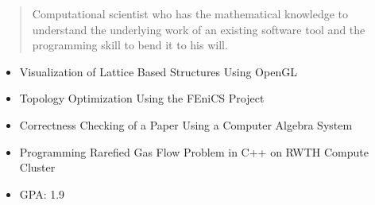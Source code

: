 \documentclass[10pt,a4paper,ragged2e,withhyper]{altacv}
\begin{document}
\begin{paracol}{2}
        \newpage
        
        \switchcolumn
        
            \begin{quote}
                Computational scientist who has the mathematical knowledge to understand the underlying 
                work of an existing software tool and the programming skill to bend it to his will.
            \end{quote}
        
            \begin{itemize}
                \item Visualization of Lattice Based Structures Using OpenGL
                \item Topology Optimization Using the FEniCS Project 
                \item Correctness Checking of a Paper Using a Computer Algebra System
            \end{itemize}
            \begin{itemize}
                \item Programming Rarefied Gas Flow Problem in C++ on RWTH Compute Cluster
            \end{itemize}
        
            \begin{itemize}
                \item GPA: 1.9
            \end{itemize}
            

\end{paracol}
\end{document}
